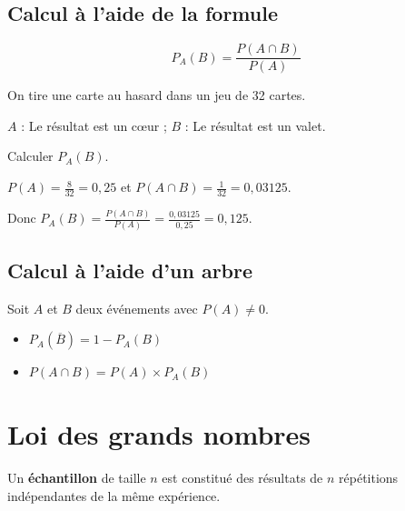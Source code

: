 \subsection{Calcul à l'aide de la formule}

\begin{propriete}
	$$P_A(B) = \frac{P(A \cap B)}{P(A)}$$
\end{propriete}

\begin{methode}
	On tire une carte au hasard dans un jeu de 32 cartes.

	$A$ : \og{}Le résultat est un cœur\fg{} ; $B$ : \og{}Le résultat est un valet\fg{}.

	Calculer $P_A(B)$.
\end{methode}

\begin{correction}
	$P(A) = \frac{8}{32} = 0,25$ et $P(A \cap B) = \frac{1}{32} = 0,03125$.

	Donc $P_A(B) = \frac{P(A \cap B)}{P(A)} = \frac{0,03125}{0,25} = 0,125$.
\end{correction}
\subsection{Calcul à l'aide d'un arbre}

\begin{propriete}
	Soit $A$ et $B$ deux événements avec $P(A) \neq 0$.
	\begin{itemize}
		\item $P_A(\overline{B}) = 1 - P_A(B)$
		\item $P(A \cap B) = P(A) \times P_A(B)$
	\end{itemize}
\end{propriete}

\begin{methode}
\end{methode}
\section{Loi des grands nombres}

\begin{definition}
	Un \textbf{échantillon} de taille $n$ est constitué des résultats de $n$ répétitions indépendantes de la même expérience.
\end{definition}

